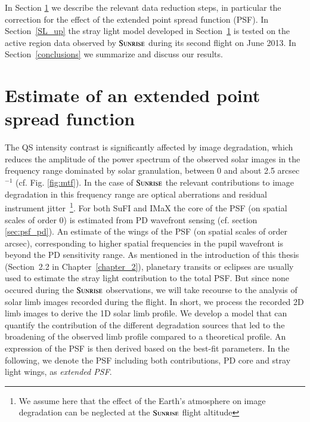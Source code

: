 \documentclass[goettingen, gauss, print]{thesis}
\begin{document}
In Section \ref{sec:psf} we describe the relevant data reduction steps, in particular the correction for the effect of the extended point spread function (PSF). In Section~\ref{SL_up} the stray light model developed in Section~\ref{sec:psf} is tested on the active region data observed by $\textsc{Sunrise}$ during its second flight on June 2013. In Section~\ref{conclusions} we summarize and discuss our results.

\section{Estimate of an extended point spread function} \label{sec:psf}

The QS intensity contrast is significantly affected by image degradation, which reduces the amplitude of the power spectrum of the observed solar images in the frequency range dominated by solar granulation, between 0 and about 2.5 arcsec$^{-1}$ (cf. Fig. \ref{fig:mtf}). In the case of $\textsc{Sunrise}$ the relevant contributions to image degradation in this frequency range are optical aberrations and residual instrument jitter~\footnote{We assume here that the effect of the Earth's atmosphere on image degradation can be neglected at the $\textsc{Sunrise}$ flight altitude}. For both SuFI and IMaX the core of the PSF (on spatial scales of order 0) is estimated from PD wavefront sensing (cf. section \ref{sec:psf_pd}). An estimate of the wings of the PSF (on spatial scales of order arcsec), corresponding to higher spatial frequencies in the pupil wavefront is beyond the PD sensitivity range. As mentioned in the introduction of this thesis (Section~2.2 in Chapter~\ref{chapter_2}), planetary transits or eclipses are usually used to estimate the stray light contribution to the total PSF. But since none occured during the $\textsc{Sunrise}$ observations, we will take recourse to the analysis of solar limb images recorded during the flight. In short, we process the recorded 2D limb images to derive the 1D solar limb profile. We develop a model that can quantify the contribution of the different degradation sources that led to the broadening of the observed limb profile compared to a theoretical profile. An expression of the PSF is then derived based on the best-fit parameters. In the following, we denote the PSF including both contributions, PD core and stray light wings, as \emph{extended PSF}. 
\end{document}
